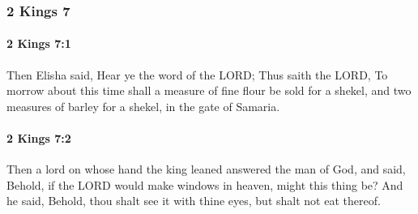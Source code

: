 	\subsubsection{2 Kings 7} %
		\label{2KINGS-7}

		\paragraph{2 Kings 7:1} %
			\label{2KINGS-7-1}

			Then Elisha said, Hear ye the word of the LORD; Thus saith the LORD, To morrow about this time shall a measure of fine flour be sold for a shekel, and two measures of barley for a shekel, in the gate of Samaria.


		\paragraph{2 Kings 7:2} %
			\label{2KINGS-7-2}

			Then a lord on whose hand the king leaned answered the man of God, and said, Behold, if the LORD would make windows in heaven, might this thing be? And he said, Behold, thou shalt see it with thine eyes, but shalt not eat thereof.

